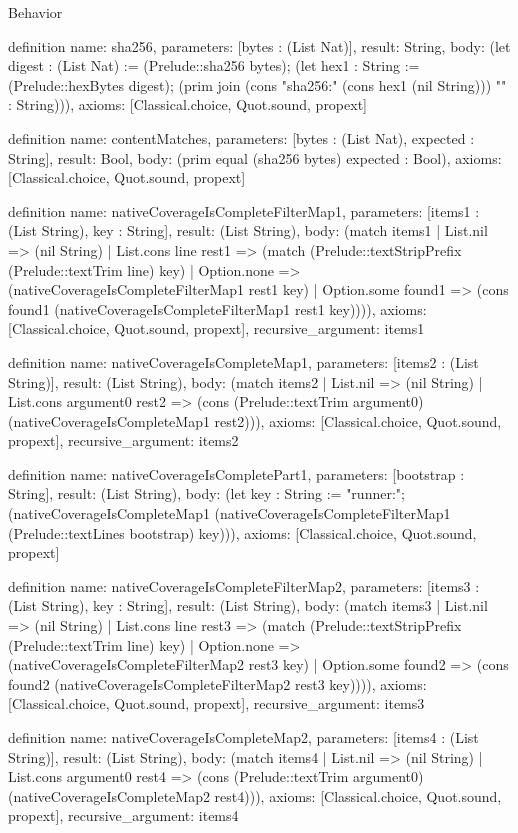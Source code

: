 \begin{lexlean}{Behavior}
\begin{semanticmodule}
definition{
  name: sha256,
  parameters: [bytes : (List Nat)],
  result: String,
  body: (let digest : (List Nat) := (Prelude::sha256 bytes); (let hex1 : String := (Prelude::hexBytes digest); (prim join (cons "sha256:" (cons hex1 (nil String))) "" : String))),
  axioms: [Classical.choice, Quot.sound, propext]
}

definition{
  name: contentMatches,
  parameters: [bytes : (List Nat), expected : String],
  result: Bool,
  body: (prim equal (sha256 bytes) expected : Bool),
  axioms: [Classical.choice, Quot.sound, propext]
}

definition{
  name: nativeCoverageIsCompleteFilterMap1,
  parameters: [items1 : (List String), key : String],
  result: (List String),
  body: (match items1
    | List.nil => (nil String)
    | List.cons line rest1 => (match (Prelude::textStripPrefix (Prelude::textTrim line) key)
      | Option.none => (nativeCoverageIsCompleteFilterMap1 rest1 key)
      | Option.some found1 => (cons found1 (nativeCoverageIsCompleteFilterMap1 rest1 key)))),
  axioms: [Classical.choice, Quot.sound, propext],
  recursive_argument: items1
}

definition{
  name: nativeCoverageIsCompleteMap1,
  parameters: [items2 : (List String)],
  result: (List String),
  body: (match items2
    | List.nil => (nil String)
    | List.cons argument0 rest2 => (cons (Prelude::textTrim argument0) (nativeCoverageIsCompleteMap1 rest2))),
  axioms: [Classical.choice, Quot.sound, propext],
  recursive_argument: items2
}

definition{
  name: nativeCoverageIsCompletePart1,
  parameters: [bootstrap : String],
  result: (List String),
  body: (let key : String := "runner:"; (nativeCoverageIsCompleteMap1 (nativeCoverageIsCompleteFilterMap1 (Prelude::textLines bootstrap) key))),
  axioms: [Classical.choice, Quot.sound, propext]
}

definition{
  name: nativeCoverageIsCompleteFilterMap2,
  parameters: [items3 : (List String), key : String],
  result: (List String),
  body: (match items3
    | List.nil => (nil String)
    | List.cons line rest3 => (match (Prelude::textStripPrefix (Prelude::textTrim line) key)
      | Option.none => (nativeCoverageIsCompleteFilterMap2 rest3 key)
      | Option.some found2 => (cons found2 (nativeCoverageIsCompleteFilterMap2 rest3 key)))),
  axioms: [Classical.choice, Quot.sound, propext],
  recursive_argument: items3
}

definition{
  name: nativeCoverageIsCompleteMap2,
  parameters: [items4 : (List String)],
  result: (List String),
  body: (match items4
    | List.nil => (nil String)
    | List.cons argument0 rest4 => (cons (Prelude::textTrim argument0) (nativeCoverageIsCompleteMap2 rest4))),
  axioms: [Classical.choice, Quot.sound, propext],
  recursive_argument: items4
}


\end{semanticmodule}
\end{lexlean}
